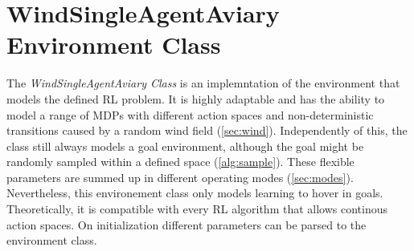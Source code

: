 \section{WindSingleAgentAviary Environment Class} \label{sec:env}
The \emph{WindSingleAgentAviary Class} is an implemntation of the environment that models the defined RL problem. It is highly adaptable and has the ability to model a range of MDPs with different action spaces and non-deterministic transitions caused by a random wind field (\cref{sec:wind}). 
Independently of this, the class still always models a goal environment, although the goal might be randomly sampled within a defined space (\cref{alg:sample}). 
These flexible parameters are summed up in different operating modes (\cref{sec:modes}). Nevertheless, this environement class only models learning to hover in goals. Theoretically, it is compatible with every RL algorithm that allows continous action spaces.
On initialization different parameters can be parsed to the environment class.

